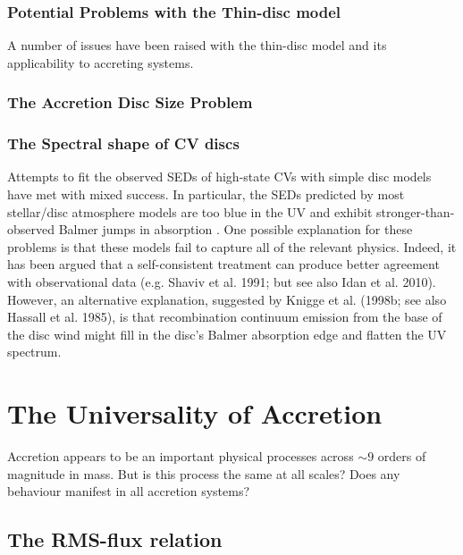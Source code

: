 \subsubsection{Potential Problems with the Thin-disc model}

A number of issues have been raised with the thin-disc model and
its applicability to accreting systems. 

\subsubsection{The Accretion Disc Size Problem}

\subsubsection{The Spectral shape of CV discs}

Attempts to fit the observed SEDs of high-state CVs with simple disc models have met with mixed success. In
particular, the SEDs predicted by most stellar/disc atmosphere models 
are too blue in the UV \citep{wade1988,long1991,long1994,knigge1998} and exhibit
stronger-than-observed Balmer jumps in absorption 
\citep{wade1984,haug1987,ladous1989b,knigge1998}. One possible
explanation for these problems is that these models fail to capture
all of the relevant physics. Indeed, it has been argued that a
self-consistent treatment can produce better agreement with 
observational data (e.g. Shaviv et al. 1991;  but see also Idan et al. 2010).
\nocite{idanshaviv2010} \nocite{shaviv1991}
However, an alternative explanation, suggested by Knigge et al.
(1998b; see also Hassall et al. 1985)\nocite{KLWB98,hassall}, 
is that recombination continuum emission from the base of the 
disc wind might fill in the disc's Balmer absorption edge and flatten the UV spectrum.








\section{The Universality of Accretion}

Accretion appears to be an important physical processes across $\sim9$ orders
of magnitude in mass. But is this process the same at all scales? Does any 
behaviour manifest in all accretion systems? 

\subsection{The RMS-flux relation}


